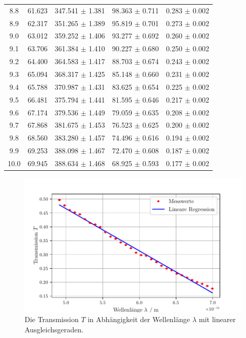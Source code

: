 \begin{table}[H]
\begin{tabular}{ccccc}
    8.8 & 61.623 & 347.541 $\pm$ 1.381 & 98.363 $\pm$ 0.711 & 0.283 $\pm$ 0.002 \\
    8.9 & 62.317 & 351.265 $\pm$ 1.389 & 95.819 $\pm$ 0.701 & 0.273 $\pm$ 0.002 \\
    9.0 & 63.012 & 359.252 $\pm$ 1.406 & 93.277 $\pm$ 0.692 & 0.260 $\pm$ 0.002 \\
    9.1 & 63.706 & 361.384 $\pm$ 1.410 & 90.227 $\pm$ 0.680 & 0.250 $\pm$ 0.002 \\
    9.2 & 64.400 & 364.583 $\pm$ 1.417 & 88.703 $\pm$ 0.674 & 0.243 $\pm$ 0.002 \\
    9.3 & 65.094 & 368.317 $\pm$ 1.425 & 85.148 $\pm$ 0.660 & 0.231 $\pm$ 0.002 \\
    9.4 & 65.788 & 370.987 $\pm$ 1.431 & 83.625 $\pm$ 0.654 & 0.225 $\pm$ 0.002 \\
    9.5 & 66.481 & 375.794 $\pm$ 1.441 & 81.595 $\pm$ 0.646 & 0.217 $\pm$ 0.002 \\
    9.6 & 67.174 & 379.536 $\pm$ 1.449 & 79.059 $\pm$ 0.635 & 0.208 $\pm$ 0.002 \\
    9.7 & 67.868 & 381.675 $\pm$ 1.453 & 76.523 $\pm$ 0.625 & 0.200 $\pm$ 0.002 \\
    9.8 & 68.560 & 383.280 $\pm$ 1.457 & 74.496 $\pm$ 0.616 & 0.194 $\pm$ 0.002 \\
    9.9 & 69.253 & 388.098 $\pm$ 1.467 & 72.470 $\pm$ 0.608 & 0.187 $\pm$ 0.002 \\
    10.0 & 69.945 & 388.634 $\pm$ 1.468 & 68.925 $\pm$ 0.593 & 0.177 $\pm$ 0.002 \\
    \bottomrule
  \end{tabular}
  \label{tab:Tabelle1}
\end{table}

\begin{figure}[H]
  \centering
  \includegraphics{build/transmission.pdf}
  \caption{Die Transmission $T$ in Abhängigkeit der Wellenlänge $\lambda$ mit linearer Ausgleichsgeraden.}
  \label{fig:transm}
\end{figure}

